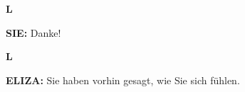 \documentclass{article}
\begin{document}
\vspace{0.5cm}

\begin{minipage}[t]{0.13\textwidth}
  \centering
  {\bfseries\fontsize{14.4}{14.4}\selectfont\textcolor{pastelgreen}{L}}
\end{minipage}%
\begin{minipage}[t]{0.81\textwidth}
  \textbf{SIE:} Danke!
\end{minipage}

\vspace{0.5cm}

\begin{minipage}[t]{0.13\textwidth}
  \centering
  {\bfseries\fontsize{14.4}{14.4}\selectfont\textcolor{pastelgreen}{L}}
\end{minipage}%
\begin{minipage}[t]{0.81\textwidth}
  \textbf{ELIZA:} Sie haben vorhin gesagt, wie Sie sich fühlen.
\end{minipage}

\vspace{0.5cm}
\end{document}
